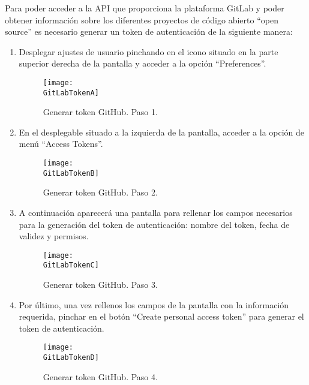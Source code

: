 Para poder acceder a la API que proporciona la plataforma GitLab y poder obtener información sobre los diferentes proyectos de código abierto ``open source'' es necesario generar un token de autenticación de la siguiente manera:

\begin{enumerate}
    \item Desplegar ajustes de usuario pinchando en el icono situado en la parte superior derecha de la pantalla y acceder a la opción ``Preferences''.

    \begin{figure}[h]
        \centering
        \texttt{[image: \\GitLabTokenA]}
        \caption{Generar token GitHub. Paso 1.}
    \end{figure}

    \item En el desplegable situado a la izquierda de la pantalla, acceder a la opción de menú ``Access Tokens''.

    \begin{figure}[h]
        \centering
        \texttt{[image: \\GitLabTokenB]}
        \caption{Generar token GitHub. Paso 2.}
    \end{figure}

    \item A continuación aparecerá una pantalla para rellenar los campos necesarios para la generación del token de autenticación: nombre del token, fecha de validez y permisos.
    
    \begin{figure}[h]
        \centering
        \texttt{[image: \\GitLabTokenC]}
        \caption{Generar token GitHub. Paso 3.}
    \end{figure}

    \item Por último, una vez rellenos los campos de la pantalla con la información requerida, pinchar en el botón ``Create personal access token'' para generar el token de autenticación.

    \begin{figure}[h]
        \centering
        \texttt{[image: \\GitLabTokenD]}
        \caption{Generar token GitHub. Paso 4.}
    \end{figure}

\end{enumerate}